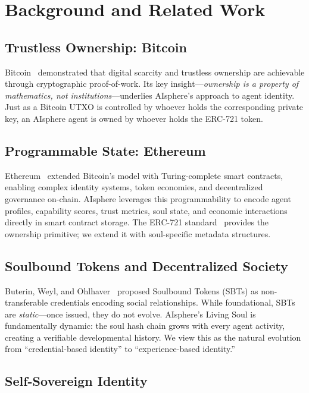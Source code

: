 \documentclass[10pt,a4paper]{article}
\theoremstyle{definition}
\theoremstyle{plain}
\begin{document}
\section{Background and Related Work}
\label{sec:related}

\subsection{Trustless Ownership: Bitcoin}

Bitcoin~\cite{nakamoto2008} demonstrated that digital scarcity and trustless ownership are achievable through cryptographic proof-of-work. Its key insight---\emph{ownership is a property of mathematics, not institutions}---underlies AIsphere's approach to agent identity. Just as a Bitcoin UTXO is controlled by whoever holds the corresponding private key, an AIsphere agent is owned by whoever holds the ERC-721 token.

\subsection{Programmable State: Ethereum}

Ethereum~\cite{buterin2014} extended Bitcoin's model with Turing-complete smart contracts, enabling complex identity systems, token economies, and decentralized governance on-chain. AIsphere leverages this programmability to encode agent profiles, capability scores, trust metrics, soul state, and economic interactions directly in smart contract storage. The ERC-721 standard~\cite{erc721} provides the ownership primitive; we extend it with soul-specific metadata structures.

\subsection{Soulbound Tokens and Decentralized Society}

Buterin, Weyl, and Ohlhaver~\cite{sbt2022} proposed Soulbound Tokens (SBTs) as non-transferable credentials encoding social relationships. While foundational, SBTs are \emph{static}---once issued, they do not evolve. AIsphere's Living Soul is fundamentally dynamic: the soul hash chain grows with every agent activity, creating a verifiable developmental history. We view this as the natural evolution from ``credential-based identity'' to ``experience-based identity.''

\subsection{Self-Sovereign Identity}
\end{document}
